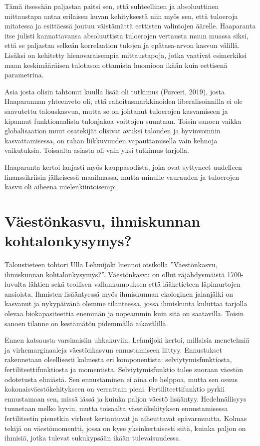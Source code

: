 \documentclass[12pt]{article}
\begin{document}
Tämä itsessään paljastaa paitsi sen, että suhteellinen ja absoluuttinen mittaustapa antaa erilaisen kuvan kehityksestä niin myös sen, että tuloeroja mitatessa ja esittäessä joutuu väistämättä eettisten valintojen äärelle. Haaparanta itse julisti kannattavansa absoluuttista tuloerojen vertausta muun muassa siksi, että se paljastaa selkeän korrelaation tulojen ja epätasa-arvon kasvun välillä. Lisäksi on kehitetty hienovaraisempia mittaustapoja, jotka vaativat esimerkiksi maan keskimääräisen tulotason ottamista huomioon ikään kuin eettisenä parametrina.

Asia josta olisin tahtonut kuulla lisää oli tutkimus (Furceri, 2019), josta Haaparannan yhteenveto oli, että rahoitusmarkkinoiden liberalisoinnilla ei ole saavutettu talouskasvua, mutta se on johtanut tuloerojen kasvamiseen ja kipannut funktionaalista tulonjakoa voittojen suuntaan. Toisin sanoen vaikka globalisaation muut osatekijät olisivat avuksi talouden ja hyvinvoinnin kasvattamisessa, on rahan liikkuvuuden vapauttamisella vain kehnoja vaikutuksia. Toisaalta asiasta oli vain yksi tutkimus tarjolla.

Haaparanta kertoi laajasti myös kauppasodista, joka ovat syttyneet uudelleen finanssikriisin jälkeisessä maailmassa, mutta minulle vaurauden ja tuloerojen kasvu oli aiheena mielenkiintoisempi.


\newpage
\section{Väestönkasvu, ihmiskunnan kohtalonkysymys?}

Taloustieteen tohtori Ulla Lehmijoki luennoi otsikolla ''Väestönkasvu, ihmiskunnan kohtalonkysymys?''. Väestönkasvu on ollut räjähdysmäistä 1700-luvulta lähtien sekä teollisen vallankumouksen että lääketieteen läpimurtojen ansioista. Ihmisten lisääntyessä myös ihmiskunnan ekologinen jalanjälki on kasvanut ja nykypäivänä olemme tilanteessa, jossa ihmiskunta kuluttaa tarjolla olevaa biokapasiteettia enemmän ja nopeammin kuin sitä on saatavilla. Toisin sanoen tilanne on kestämätön pidemmällä aikavälillä.

Ennen katsausta varsinaisiin uhkakuviin, Lehmijoki kertoi, millaisia menetelmiä ja virhemarginaaleja väestönkasvun ennustamiseen liittyy. Ennustukset rakennetaan oleellisesti kolmesta eri komponentista: selviytymisfunktiosta, fertiliteettifunktiosta ja momentista. Selviytymisfunktio tulee suoraan väestön odotetusta eliniästä. Sen ennustaminen ei aina ole helppoa, mutta sen osuus kokonaisväestökehitykseen on verrattain pieni. Fertiliteettifunktio pyrkii ennustamaan sen, missä iässä ja kuinka paljon väestö lisääntyy. Hedelmällisyys tunnetaan melko hyvin, mutta toisaalta väestökehityksen ennustamisessa fertiliteetin pienetkin virheet kertautuvat ja aiheuttavat epävarmuutta. Kolmas tekijä on väestömomentti, jossa on kyse yksinkertaisesti siitä, kuinka paljon on ihmisiä, jotka tulevat sukukypsään ikään tulevaisuudessa.
\end{document}
